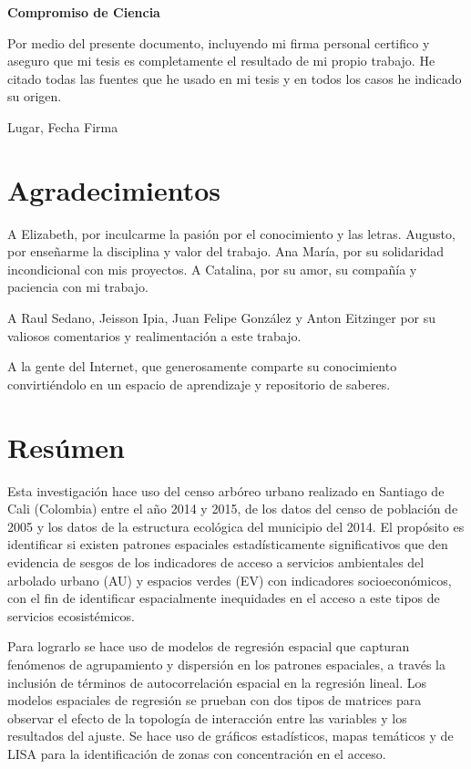 \documentclass[12pt,a4paper,openany]{book}
\title{}
\author{}
\date{}
\theoremstyle{definition}
\theoremstyle{definition}
\theoremstyle{definition}
\theoremstyle{remark}
\begin{document}
% 


\textbf{Compromiso de Ciencia}

Por medio del presente documento, incluyendo mi firma personal certifico
y aseguro que mi tesis es completamente el resultado de mi propio
trabajo. He citado todas las fuentes que he usado en mi tesis y en todos
los casos he indicado su origen.

\bigskip
\hrulefill 

Lugar, Fecha \hfill Firma

\chapter*{Agradecimientos}\label{agradecimientos}

A Elizabeth, por inculcarme la pasión por el conocimiento y las letras.
Augusto, por enseñarme la disciplina y valor del trabajo. Ana María, por
su solidaridad incondicional con mis proyectos. A Catalina, por su amor,
su compañía y paciencia con mi trabajo.

A Raul Sedano, Jeisson Ipia, Juan Felipe González y Anton Eitzinger por
su valiosos comentarios y realimentación a este trabajo.

A la gente del Internet, que generosamente comparte su conocimiento
convirtiéndolo en un espacio de aprendizaje y repositorio de saberes.


\chapter*{Resúmen}\label{resumen}


Esta investigación hace uso del censo arbóreo urbano realizado en
Santiago de Cali (Colombia) entre el año 2014 y 2015, de los datos del
censo de población de 2005 y los datos de la estructura ecológica del
municipio del 2014. El propósito es identificar si existen patrones
espaciales estadísticamente significativos que den evidencia de sesgos
de los indicadores de acceso a servicios ambientales del arbolado urbano
(AU) y espacios verdes (EV) con indicadores socioeconómicos, con el fin
de identificar espacialmente inequidades en el acceso a este tipos de
servicios ecosistémicos.

Para lograrlo se hace uso de modelos de regresión espacial que capturan
fenómenos de agrupamiento y dispersión en los patrones espaciales, a
través la inclusión de términos de autocorrelación espacial en la
regresión lineal. Los modelos espaciales de regresión se prueban con dos
tipos de matrices para observar el efecto de la topología de interacción
entre las variables y los resultados del ajuste. Se hace uso de gráficos
estadísticos, mapas temáticos y de LISA para la identificación de zonas
con concentración en el acceso.
\end{document}
